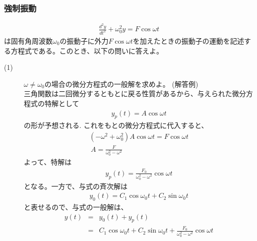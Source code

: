 \documentclass[a4paper,11pt,fleqn]{jarticle}
\begin{document}
\subsubsection{強制振動}
\begin{eqnarray*}
\frac{d^2y}{dt^2}+\omega_0^2y=F\cos{\omega{t}}
\end{eqnarray*}
は固有角周波数$\omega_0$の振動子に外力$F\cos{\omega{t}}$を加えたときの振動子の運動を記述する方程式である。このとき、以下の問いに答えよ。
\begin{description}
\item[(1)]$\omega\neq\omega_0$の場合の微分方程式の一般解を求めよ。
(解答例)\\
三角関数は二回微分するともとに戻る性質があるから、与えられた微分方程式の特解として
\begin{eqnarray*}
y_p(t)=A\cos{\omega{t}}
\end{eqnarray*}
の形が予想される. これをもとの微分方程式に代入すると、
\begin{eqnarray*}
(-\omega^2+\omega_0^2)A\cos{\omega{t}}=F\cos{\omega{t}}\\
\  A=\frac{F}{\omega_0^2-\omega^2}
\end{eqnarray*}
よって、特解は
\begin{eqnarray*}
y_p(t)=\frac{F_0}{\omega_0^2-\omega^2}\cos{\omega{t}}
\end{eqnarray*}
となる。一方で、与式の斉次解は
\begin{eqnarray*}
y_0(t)=C_1\cos{\omega_0{t}}+C_2\sin{\omega_0{t}}
\end{eqnarray*}
と表せるので、与式の一般解は、
\begin{eqnarray*}
y(t)&=&y_0(t)+y_p(t)\\
     &=&C_1\cos{\omega_0{t}}+C_2\sin{\omega_0{t}}+\frac{F_0}{\omega_0^2-\omega^2}\cos{\omega{t}}
\end{eqnarray*}


\end{description}
\end{document}
